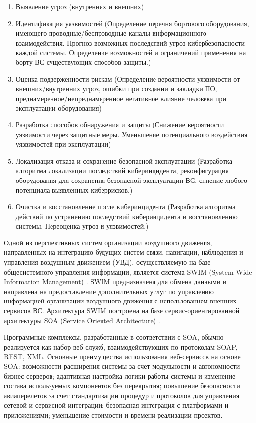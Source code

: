 \begin{enumerate}
\item
Выявление угроз (внутренних и внешних)
\item
Идентификация уязвимостей (Определение перечня бортового оборудования, имеющего проводные/беспроводные каналы
информационного взаимодействия. Прогноз возможных последствий угроз кибербезопасности каждой системы.
Определение возможностей и ограничений применения на борту ВС существующих способов защиты.)
\item
Оценка подверженности рискам (Определение вероятности уязвимости от внешних/внутренних угроз,
ошибки при создании и закладки ПО, преднамеренное/непреднамеренное негативное влияние
человека при эксплуатации оборудования)
\item
Разработка способов обнаружения и защиты (Снижение вероятности уязвимости через защитные меры. Уменьшение
потенциального воздействия уязвимостей при эксплуатации)
\item
Локализация отказа и сохранение безопасной эксплуатации (Разработка алгоритма локализации последствий
киберинцидента, реконфигурация оборудования для сохранения безопасной эксплуатации ВС, сниение любого потенциала
выявленных киберрисков.)
\item
Очистка и восстановление после киберинцидента (Разработка алгоритма действий по устранению последствий
киберинцидента и восстановлению системы. Переоценка угроз и уязвимостей.)
\end{enumerate}

Одной из перспективных систем организации воздушного движения, направленных
на интеграцию будущих систем связи, навигации, наблюдения и управления воздушным
движением (УВД), осуществляемую на базе общесистемного управления информации, является
система SWIM (System Wide Information Management) \cite{concept}. SWIM предназначена для обмена
данными и направлена на предоставление дополнительных услуг по управлению информацией
организации воздушного движения с использованием внешних сервисов ВС. Архитектура SWIM построена
на базе сервис-ориентированной архитектуры SOA (Service Oriented Architecture) \cite{soa}.

Программные комплексы, разработанные в соответствии с SOA, обычно реализуется как набор веб-служб,
взаимодействующих по протоколам SOAP, REST, XML. Основные преимущества использования веб-сервисов на основе SOA:
возможности расширения системы за счет модульности и автономности бизнес-серверов;
адаптивная настройка логики работы системы и изменение состава используемых компонентов без перекрытия;
повышение безопасности авиаперелетов за счет стандартизации процедур и протоколов для управления сетевой
и сервисной интеграции; безопасная интеграция с платформами и приложениями;
уменьшение стоимости и времени реализации проектов.

